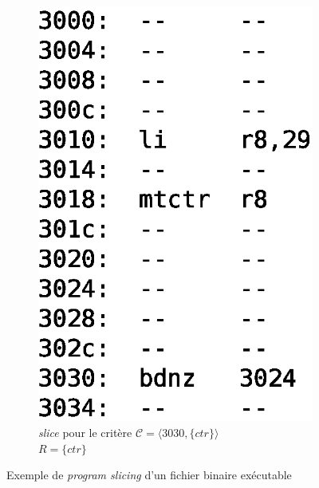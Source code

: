 \begin{figure}[ht]
\begin{subfigure}{.45\textwidth}
        \includegraphics[scale=0.45]{img/slice2.eps}
        \caption{\emph{slice} pour le critère $\mathcal{C} = \langle 3030, \{ ctr \} \rangle$ \\
        $R = \{ctr\}$}
        \label{fig:slice2}
      \end{subfigure}
      \caption{Exemple de \emph{program slicing} d'un fichier binaire exécutable}
    \end{figure}

  
